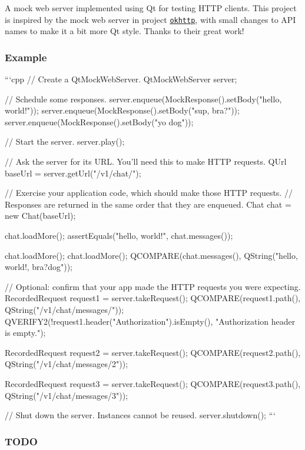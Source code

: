 A mock web server implemented using Qt for testing H\+T\+T\+P clients. This project is inspired by the mock web server in project \href{https://github.com/square/okhttp/tree/master/mockwebserver}{\tt okhttp}, with small changes to A\+P\+I names to make it a bit more Qt style. Thanks to their great work!

\subsubsection*{Example}

\begin{DoxyVerb}```cpp
// Create a QtMockWebServer.
QtMockWebServer server;

// Schedule some responses.
server.enqueue(MockResponse().setBody("hello, world!"));
server.enqueue(MockResponse().setBody("sup, bra?"));
server.enqueue(MockResponse().setBody("yo dog"));

// Start the server.
server.play();

// Ask the server for its URL. You'll need this to make HTTP requests.
QUrl baseUrl = server.getUrl("/v1/chat/");

// Exercise your application code, which should make those HTTP requests.
// Responses are returned in the same order that they are enqueued.
Chat chat = new Chat(baseUrl);

chat.loadMore();
assertEquals("hello, world!", chat.messages());

chat.loadMore();
chat.loadMore();
QCOMPARE(chat.messages(), QString("hello, world!\nsup, bra?\nyo dog"));

// Optional: confirm that your app made the HTTP requests you were expecting.
RecordedRequest request1 = server.takeRequest();
QCOMPARE(request1.path(), QString("/v1/chat/messages/"));
QVERIFY2(!request1.header("Authorization").isEmpty(), "Authorization header is empty.");

RecordedRequest request2 = server.takeRequest();
QCOMPARE(request2.path(), QString("/v1/chat/messages/2"));

RecordedRequest request3 = server.takeRequest();
QCOMPARE(request3.path(), QString("/v1/chat/messages/3"));

// Shut down the server. Instances cannot be reused.
server.shutdown();
```
\end{DoxyVerb}


\subsubsection*{T\+O\+D\+O}


